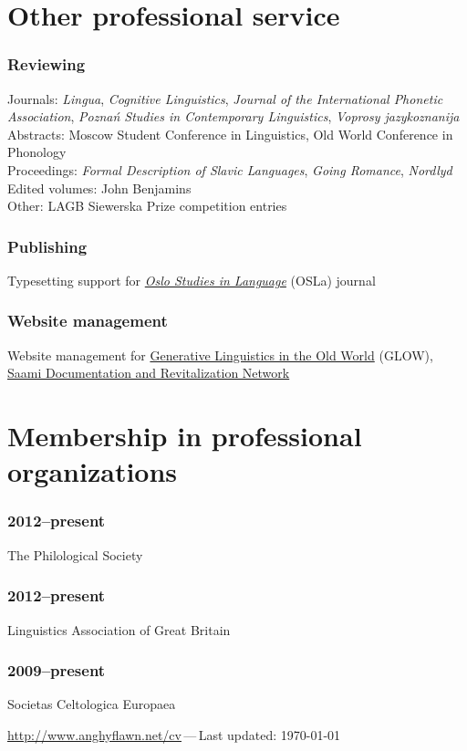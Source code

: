 \documentclass[a4paper,11pt]{article}
\newlength\blockwidth
\newcommand\cvitem[1]{\hspace*{\blockwidth}\begin{minipage}[t]{\linewidth-\blockwidth}
#1
\end{minipage}\par}
\newcommand{\block}[2]{\subsubsection{#1}\cvitem{#2}}
\begin{document}
\section{Other professional service}

\block{Reviewing}{Journals: \emph{Lingua}, \emph{Cognitive Linguistics}, \emph{Journal of the International Phonetic Association}, \emph{Poznań Studies in Contemporary Linguistics}, \emph{Voprosy jazykoznanija}\\
Abstracts: Moscow Student Conference in Linguistics, Old World Conference in Phonology\\
Proceedings: \emph{Formal Description of Slavic Languages}, \emph{Going Romance}, \emph{Nordlyd}\\
Edited volumes: John Benjamins\\
Other: LAGB Siewerska Prize competition entries}
\block{Publishing}{Typesetting support for \href{https://www.journals.uio.no/index.php/osla/index}{\emph{Oslo Studies in Language}} (OSLa) journal}
\block{Website management}{Website management for \href{http://www.glow-linguistics.org}{Generative Linguistics in the Old World} (GLOW), \href{http://saamidocnet.uit.no}{Saami Documentation and Revitalization Network}}


\section{Membership in professional organizations}
\block{2012--present}{The Philological Society}
\block{2012--present}{Linguistics Association of Great Britain}
\block{2009--present}{Societas Celtologica Europaea}

\vfill{}
\hrulefill

\begin{center}
{\footnotesize \href{http://www.anghyflawn.net/cv}{http://www.anghyflawn.net/cv}{\,---\,}Last  updated: \today
}
\end{center}
\end{document}
